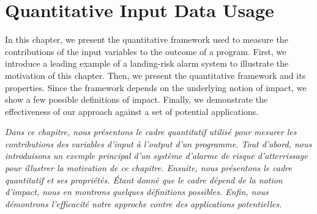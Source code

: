 %

\chapter{Quantitative Input Data Usage}


In this chapter, we present the quantitative framework used to measure the contributions of the input variables to the outcome of a program. First, we introduce a leading example of a landing-risk alarm system to illustrate the motivation of this chapter. Then, we present the quantitative framework and its properties. Since the framework depends on the underlying notion of impact, we show a few possible definitions of impact. Finally, we demonstrate the effectiveness of our approach against a set of potential applications.

\textit{Dans ce chapitre, nous présentons le cadre quantitatif utilisé pour mesurer les contributions des variables d'input à l'output d'un programme. Tout d'abord, nous introduisons un exemple principal d'un système d'alarme de risque d'atterrissage pour illustrer la motivation de ce chapitre. Ensuite, nous présentons le cadre quantitatif et ses propriétés. Étant donné que le cadre dépend de la notion d'impact, nous en montrons quelques définitions possibles. Enfin, nous démontrons l'efficacité notre approche contre des applications potentielles.}




% 


